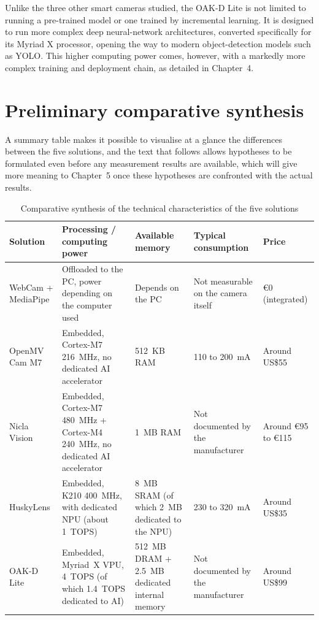 \documentclass[12pt,a4paper]{report}
\begin{document}
	\newpage
	
	Unlike the three other smart cameras studied, the OAK-D Lite is not limited to running a pre-trained model or one trained by incremental learning. It is designed to run more complex deep neural-network architectures, converted specifically for its Myriad X processor, opening the way to modern object-detection models such as YOLO. This higher computing power comes, however, with a markedly more complex training and deployment chain, as detailed in Chapter~4.
	
	
	\section{Preliminary comparative synthesis}
	
	A summary table makes it possible to visualise at a glance the differences between the five solutions, and the text that follows allows hypotheses to be formulated even before any measurement results are available, which will give more meaning to Chapter~5 once these hypotheses are confronted with the actual results.
	
	\begin{table}[H]
		\centering
		\footnotesize
		\renewcommand{\arraystretch}{1.05}
		\begin{tabularx}{\textwidth}{|l|X|X|X|l|}
			\hline
			\textbf{Solution} & \textbf{Processing / computing power} & \textbf{Available memory} & \textbf{Typical consumption} & \textbf{Price} \\
			\hline
			WebCam + MediaPipe & Offloaded to the PC, power depending on the computer used & Depends on the PC & Not measurable on the camera itself & €0 (integrated) \\
			\hline
			OpenMV Cam M7 & Embedded, Cortex-M7 216~MHz, no dedicated AI accelerator & 512~KB RAM & 110 to 200~mA & Around US\$55 \\
			\hline
			Nicla Vision & Embedded, Cortex-M7 480~MHz + Cortex-M4 240~MHz, no dedicated AI accelerator & 1~MB RAM & Not documented by the manufacturer & Around €95 to €115 \\
			\hline
			HuskyLens & Embedded, K210 400~MHz, with dedicated NPU (about 1~TOPS) & 8~MB SRAM (of which 2~MB dedicated to the NPU) & 230 to 320~mA & Around US\$35 \\
			\hline
			OAK-D Lite & Embedded, Myriad~X VPU, 4~TOPS (of which 1.4~TOPS dedicated to AI) & 512~MB DRAM + 2.5~MB dedicated internal memory & Not documented by the manufacturer & Around US\$99 \\
			\hline
		\end{tabularx}
		\caption{Comparative synthesis of the technical characteristics of the five solutions}
		\label{tab:synthese-preliminaire}
	\end{table}
	
\end{document}
